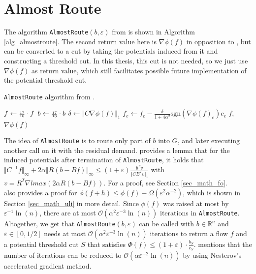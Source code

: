 \section{Almost Route}
\label{sec_alg_ar}
The algorithm \texttt{AlmostRoute}$(b,\varepsilon)$ from \cite{nmfnlt} is shown in Algorithm \ref{alg_almostroute}. The second return value here is $\nabla \phi(f)$ in opposition to \cite{nmfnlt}, but can be converted to a cut by taking the potentials induced from it and constructing a threshold cut. In this thesis, this cut is not needed, so we just use $\nabla\phi(f)$ as return value, which still facilitates possible future implementation of the potential threshold cut.
\begin{algorithm}
\caption{\texttt{AlmostRoute} algorithm from \cite{nmfnlt}.}\label{alg_almostroute}
\begin{algorithmic}[1]
\Repeat
    \State $f\gets \mathsmaller{\frac{17}{16}}\cdot f$
    \State $b\gets \mathsmaller{\frac{17}{16}}\cdot b$
  \EndWhile
  \State $\delta\gets \Vert C\nabla \phi(f)\Vert_1$
    \State $f_e\gets f_e-\frac{\delta}{1+4\alpha^2}\text{sgn}(\nabla \phi(f)_e)c_e$
  \EndIf
{}
\State \Return $f$, $\nabla\phi(f)$
\EndProcedure
\end{algorithmic}
\end{algorithm}
The idea of \texttt{AlmostRoute} is to route only part of $b$ into $G$, and later executing another call on it with the residual demand. \cite{nmfnlt} provides a lemma that for the induced potentials after termination of \texttt{AlmostRoute}, it holds that $\Vert C^{-1}f\Vert_\infty+2\alpha\Vert R(b-Bf)\Vert_\infty\leq (1+\varepsilon)\frac{b^Tv}{\Vert CB^Tv\Vert_1}$ with $v=R^T\nabla lmax(2\alpha R(b-Bf))$. For a proof, see Section \ref{sec_math_fo}.\\
\cite{nmfnlt} also provides a proof for $\phi(f+h)\leq \phi(f)-\Omega(\varepsilon^2\alpha^{-2})$, which is shown in Section \ref{sec_math_uli} in more detail. Since $\phi(f)$ was raised at most by $\varepsilon^{-1}\ln(n)$, there are at most $\mathcal{O}(\alpha^2\varepsilon^{-3}\ln(n))$ iterations in \texttt{AlmostRoute}.\\
Altogether, we get that \texttt{AlmostRoute}$(b,\varepsilon)$ can be called with $b\in\mathbb{R}^n$ and $\varepsilon\in[0,1/2]$ needs at most $\mathcal{O}(\alpha^2\varepsilon^{-3}\ln(n))$ iterations to return a flow $f$ and a potential threshold cut $S$ that satisfies $\Phi(f)\leq (1+\varepsilon)\cdot \frac{b_S}{c_S}$. \cite{nmfnlt} mentions that the number of iterations can be reduced to $\mathcal{O}(\alpha\varepsilon^{-2}\ln(n))$ by using Nesterov's accelerated gradient method.

